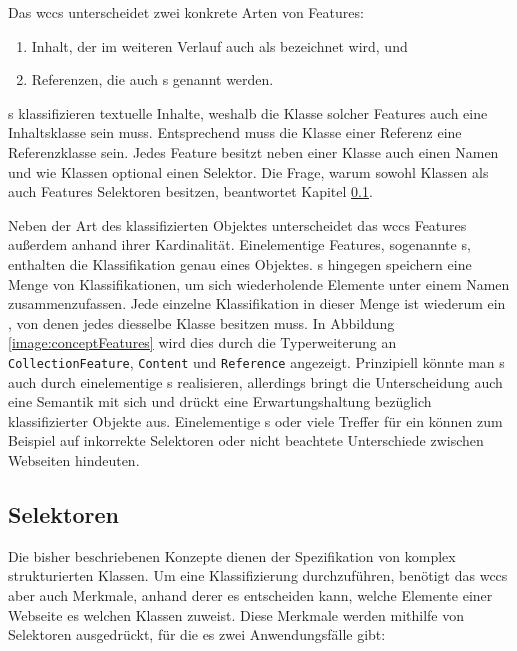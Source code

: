         Das \gls{wccs} unterscheidet zwei konkrete Arten von Features:
        
        \begin{enumerate}
            \item Inhalt, der im weiteren Verlauf auch als {\contentFeature} bezeichnet wird, und
            \item Referenzen, die auch {}s genannt werden.
        \end{enumerate}

        {\contentFeature}s klassifizieren textuelle Inhalte,
        weshalb die Klasse solcher Features auch eine Inhaltsklasse sein muss.
        Entsprechend muss die Klasse einer Referenz eine Referenzklasse sein.
        Jedes Feature besitzt neben einer Klasse auch einen Namen und wie Klassen optional einen Selektor.
        Die Frage, warum sowohl Klassen als auch Features Selektoren besitzen,
        beantwortet Kapitel \ref{section:conteptSelectors}.

        Neben der Art des klassifizierten Objektes unterscheidet das \gls{wccs} Features
        außerdem anhand ihrer Kardinalität.
        Einelementige Features, sogenannte {\scalarFeature}s, enthalten die Klassifikation genau eines Objektes.
        {\collectionFeature}s hingegen speichern eine Menge von Klassifikationen,
        um sich wiederholende Elemente unter einem Namen zusammenzufassen.
        Jede einzelne Klassifikation in dieser Menge ist wiederum ein {\scalarFeature},
        von denen jedes diesselbe Klasse besitzen muss.
        In Abbildung \ref{image:conceptFeatures} wird dies durch die Typerweiterung an
        \texttt{CollectionFeature}, \texttt{Content} und \texttt{Reference} angezeigt.
        Prinzipiell könnte man {\scalarFeature}s auch durch einelementige {\collectionFeature}s realisieren,
        allerdings bringt die Unterscheidung auch eine Semantik mit sich und drückt eine
        Erwartungshaltung bezüglich klassifizierter Objekte aus.       
        Einelementige {\collectionFeature}s oder viele Treffer für ein {\scalarFeature}
        können zum Beispiel auf inkorrekte Selektoren oder nicht beachtete Unterschiede zwischen Webseiten hindeuten.

    \subsection{Selektoren}
        \label{section:conteptSelectors}
        Die bisher beschriebenen Konzepte dienen der Spezifikation von komplex strukturierten Klassen.
        Um eine Klassifizierung durchzuführen, benötigt das \gls{wccs} aber auch Merkmale,
        anhand derer es entscheiden kann,
        welche Elemente einer Webseite es welchen Klassen zuweist.
        Diese Merkmale werden mithilfe von Selektoren ausgedrückt,
        für die es  zwei Anwendungsfälle gibt:


